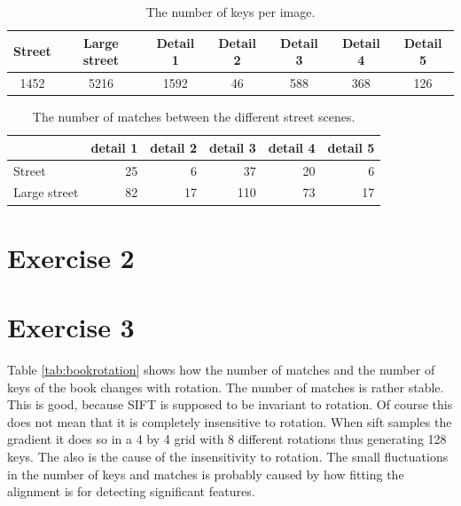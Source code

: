 \documentclass[11pt,a4paper]{article}
\begin{document}
\begin{table}
    \centering
    \begin{tabular}{c|c|c|c|c|c|c}
        Street & Large street & Detail 1 & Detail 2 & Detail 3 & Detail 4 & Detail 5 \\
        \hline
        1452 & 5216 & 1592 & 46 & 588 & 368 & 126 \\
    \end{tabular}
    \caption{The number of keys per image.}
    \label{tab:streetkeys}
\end{table}

\begin{table}
    \centering
    \begin{tabular}{l|r|r|r|r|r|}
        & detail 1 & detail 2 & detail 3 & detail 4 & detail 5 \\
        \hline
        Street & 25 & 6 & 37 & 20 & 6 \\
        \hline
        Large street & 82 & 17 & 110 & 73 & 17 \\
        \hline
    \end{tabular}
    \caption{The number of matches between the different street scenes.}
    \label{tab:streetdetails}
\end{table}

\section*{Exercise 2}

\section*{Exercise 3}

Table \ref{tab:bookrotation} shows how the number of matches and the number of keys of the book changes with rotation.
The number of matches is rather stable.
This is good, because SIFT is supposed to be invariant to rotation.
Of course this does not mean that it is completely insensitive to rotation.
When sift samples the gradient it does so in a 4 by 4 grid with 8 different rotations thus generating 128 keys.
The also is the cause of the insensitivity to rotation.
The small fluctuations in the number of keys and matches is probably caused by how fitting the alignment is for detecting significant features.
\end{document}
